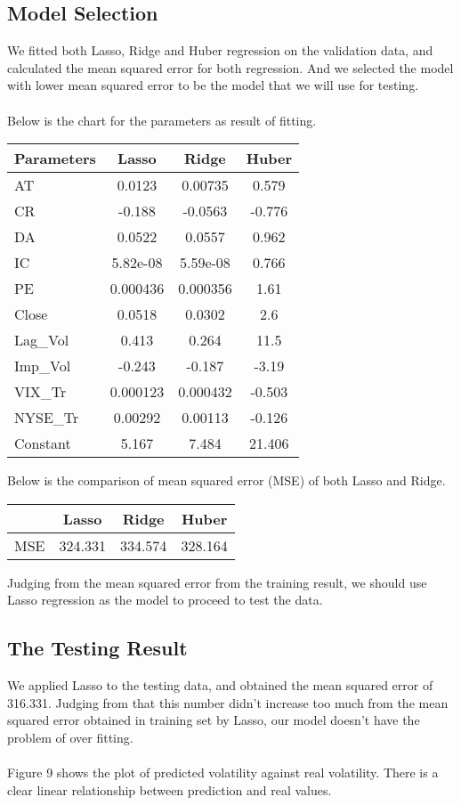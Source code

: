 \documentclass[a4paper]{article}
\begin{document}
\subsection{Model Selection}
We fitted both Lasso, Ridge and Huber regression on the validation data, and calculated the mean squared error for both regression. And we selected the model with lower mean squared error to be the model that we will use for testing.
\\\\Below is the chart for the parameters as result of fitting.
\begin{center}
\begin{tabular}{ l | c | c | c  }
 \hline
Parameters& Lasso & Ridge & Huber\\
 \hline
AT & 0.0123 & 0.00735 & 0.579\\
 \hline
CR & -0.188 & -0.0563 & -0.776\\
 \hline
DA & 0.0522 & 0.0557 & 0.962\\
 \hline
IC & 5.82e-08 & 5.59e-08 & 0.766\\
 \hline
PE & 0.000436 & 0.000356 & 1.61\\
 \hline
Close & 0.0518 & 0.0302 & 2.6\\
 \hline
Lag\_Vol & 0.413 & 0.264 & 11.5\\
 \hline
Imp\_Vol & -0.243 & -0.187 & -3.19\\
 \hline
VIX\_Tr & 0.000123 & 0.000432 & -0.503\\
 \hline
NYSE\_Tr & 0.00292 & 0.00113 & -0.126\\
 \hline
Constant & 5.167 & 7.484 & 21.406\\
\hline
 \end{tabular}
\end{center}   
Below is the comparison of mean squared error (MSE) of both Lasso and Ridge.
\begin{center}
\begin{tabular}{ l | c | c | c }
 \hline
 & Lasso & Ridge & Huber\\
 \hline
MSE & 324.331 & 334.574 & 328.164\\
\hline
 \end{tabular}
\end{center}   
Judging from the mean squared error from the training result, we should use Lasso regression as the model to proceed to test the data.

\subsection{The Testing Result}
We applied Lasso to the testing data, and obtained the mean squared error of 316.331. Judging from that this number didn't increase too much from the mean squared error obtained in training set by Lasso, our model doesn't have the problem of over fitting. 
\\\\Figure 9 shows the plot of predicted volatility against real volatility. There is a clear linear relationship between prediction and real values.
\end{document}
